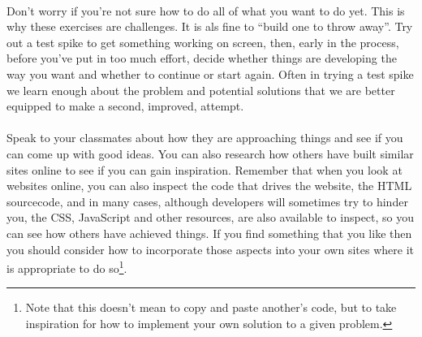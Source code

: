 \documentclass[10pt, a4paper]{article}
\begin{document}
\begin{enumerate}
\end{enumerate}

\paragraph{} Don't worry if you're not sure how to do all of what you want to do yet. This is why these exercises are challenges. It is als fine to ``build one to throw away''. Try out a test spike to get something working on screen, then, early in the process, before you've put in too much effort, decide whether things are developing the way you want and whether to continue or start again. Often in trying a test spike we learn enough about the problem and potential solutions that we are better equipped to make a second, improved, attempt.

\paragraph{} Speak to your classmates about how they are approaching things and see if you can come up with good ideas. You can also research how others have built similar sites online to see if you can gain inspiration. Remember that when you look at websites online, you can also inspect the code that drives the website, the HTML sourcecode, and in many cases, although developers will sometimes try to hinder you, the CSS, JavaScript and other resources, are also available to inspect, so you can see how others have achieved things. If you find something that you like then you should consider how to incorporate those aspects into your own sites where it is appropriate to do so\footnote{Note that this doesn't mean to copy and paste another's code, but to take inspiration for how to implement your own solution to a given problem.}.
\end{document}
